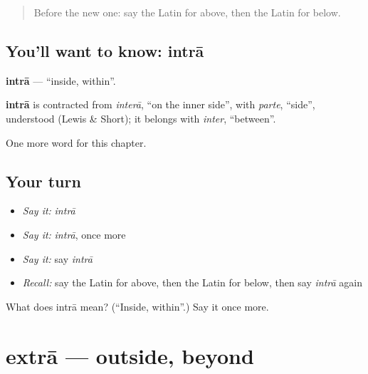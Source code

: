 \label{lesson:LA-C102-intra}



\begin{quote}
Before the new one: say the Latin for above, then the Latin for below.
\end{quote}

\subsection*{You'll want to know: intrā}
\textbf{intrā} — \textquotedblleft{}inside, within\textquotedblright{}.

\begin{cousinweb}
\textbf{intrā} is contracted from \emph{interā}, \textquotedblleft{}on the inner side\textquotedblright{}, with \emph{parte}, \textquotedblleft{}side\textquotedblright{}, understood (Lewis \& Short); it belongs with \emph{inter}, \textquotedblleft{}between\textquotedblright{}.
\end{cousinweb}

\begin{grammarlens}[title={What you've built}]
One more word for this chapter.
\end{grammarlens}

\subsection*{Your turn}
\begin{itemize}
\raggedright
  \item \emph{Say it:} \emph{intrā}
  \item \emph{Say it:} \emph{intrā}, once more
  \item \emph{Say it:} say \emph{intrā}
  \item \emph{Recall:} say the Latin for above, then the Latin for below, then say \emph{intrā} again
\end{itemize}

\begin{tcolorbox}[breakable,colback=teal!4,colframe=teal!35!black,title={Before you move on}]
What does intrā mean? (\textquotedblleft{}Inside, within\textquotedblright{}.) Say it once more.
\end{tcolorbox}
\section[extrā]{extrā — outside, beyond}

\label{lesson:LA-C102-extra}



